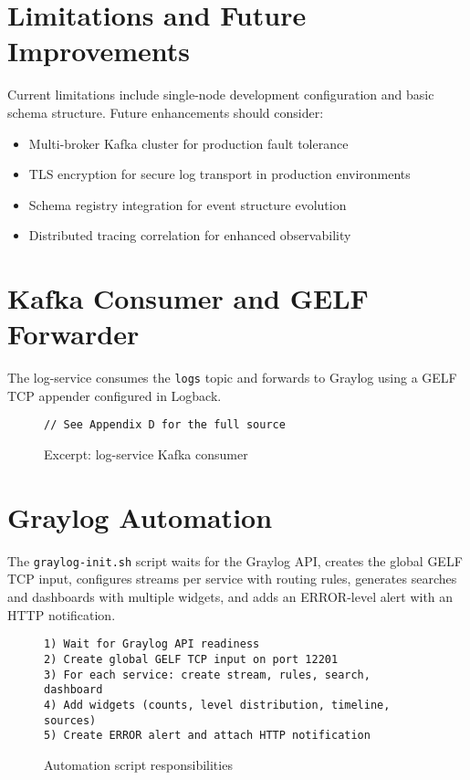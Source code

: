 \documentclass[12pt,a4paper]{report}
\begin{document}
\section{Limitations and Future Improvements}
Current limitations include single-node development configuration and basic schema structure. Future enhancements should consider:
\begin{itemize}[leftmargin=1.2cm]
  \item Multi-broker Kafka cluster for production fault tolerance
  \item TLS encryption for secure log transport in production environments
  \item Schema registry integration for event structure evolution
  \item Distributed tracing correlation for enhanced observability
\end{itemize}

\section{Kafka Consumer and GELF Forwarder}
The log-service consumes the \texttt{logs} topic and forwards to Graylog using a GELF TCP appender configured in Logback.

\begin{figure}[H]
\centering
\begin{Verbatim}[frame=single, fontsize=\small, xleftmargin=1cm, xrightmargin=1cm]
// See Appendix D for the full source
\end{Verbatim}
\caption{Excerpt: log-service Kafka consumer}
\label{fig:logconsumer}
\end{figure}

\section{Graylog Automation}
The \texttt{graylog-init.sh} script waits for the Graylog API, creates the global GELF TCP input, configures streams per service with routing rules, generates searches and dashboards with multiple widgets, and adds an ERROR-level alert with an HTTP notification.

\begin{figure}[H]
\centering
\begin{Verbatim}[frame=single, fontsize=\small, xleftmargin=1cm, xrightmargin=1cm]
1) Wait for Graylog API readiness
2) Create global GELF TCP input on port 12201
3) For each service: create stream, rules, search, dashboard
4) Add widgets (counts, level distribution, timeline, sources)
5) Create ERROR alert and attach HTTP notification
\end{Verbatim}
\caption{Automation script responsibilities}
\label{fig:initoverview}
\end{figure}
\end{document}
